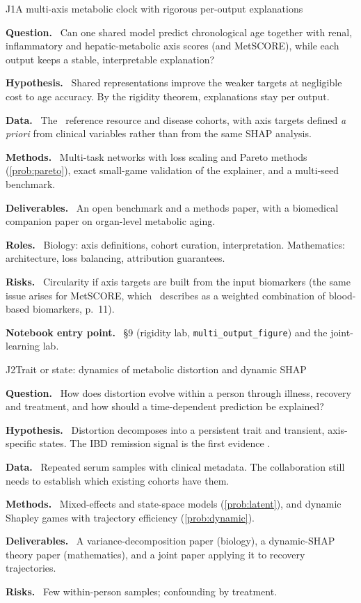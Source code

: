\documentclass[11pt,a4paper]{article}
\newcommand{\field}[1]{\par\noindent\textbf{\color{navy}#1.}\ }
\theoremstyle{plain}
\theoremstyle{definition}
\theoremstyle{remark}
\begin{document}
\begin{projectcard}{J1}{A multi-axis metabolic clock with rigorous per-output explanations}
\label{card:J1}
\field{Question} Can one shared model predict chronological age together with renal, inflammatory and hepatic-metabolic axis scores (and MetSCORE), while each output keeps a stable, interpretable explanation?
\field{Hypothesis} Shared representations improve the weaker targets at negligible cost to age accuracy. By the rigidity theorem, explanations stay per output.
\field{Data} The \PI\ reference resource and disease cohorts, with axis targets defined \emph{a priori} from clinical variables rather than from the same SHAP analysis.
\field{Methods} Multi-task networks with loss scaling and Pareto methods (\cref{prob:pareto}), exact small-game validation of the explainer, and a multi-seed benchmark.
\field{Deliverables} An open benchmark and a methods paper, with a biomedical companion paper on organ-level metabolic aging.
\field{Roles} Biology: axis definitions, cohort curation, interpretation. Mathematics: architecture, loss balancing, attribution guarantees.
\field{Risks} Circularity if axis targets are built from the input biomarkers (the same issue arises for MetSCORE, which \PII\ describes as a weighted combination of blood-based biomarkers, p.~11).
\field{Notebook entry point} §9 (rigidity lab, \texttt{multi\_output\_figure}) and the joint-learning lab.
\end{projectcard}

\begin{projectcard}{J2}{Trait or state: dynamics of metabolic distortion and dynamic SHAP}
\label{card:J2}
\field{Question} How does distortion evolve within a person through illness, recovery and treatment, and how should a time-dependent prediction be explained?
\field{Hypothesis} Distortion decomposes into a persistent trait and transient, axis-specific states. The IBD remission signal is the first evidence \PI[p.~8].
\field{Data} Repeated serum samples with clinical metadata. The collaboration still needs to establish which existing cohorts have them.
\field{Methods} Mixed-effects and state-space models (\cref{prob:latent}), and dynamic Shapley games with trajectory efficiency (\cref{prob:dynamic}).
\field{Deliverables} A variance-decomposition paper (biology), a dynamic-SHAP theory paper (mathematics), and a joint paper applying it to recovery trajectories.
\field{Risks} Few within-person samples; confounding by treatment.
\end{projectcard}
\end{document}
